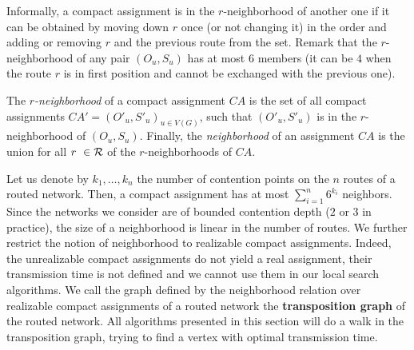 Informally, a compact assignment is in the $r$-neighborhood of another one if it can be obtained by 
moving down $r$ once (or not changing it) in the order and adding or removing $r$ and the previous route from the set. 
Remark that the $r$-neighborhood of any pair $(O_u,S_u)$ has at most $6$ members (it can be $4$ when the route $r$ is in first position and cannot be exchanged with the previous one). 

The \emph{$r$-neighborhood} of a compact assignment $CA$ is the set of all compact assignments $CA'=(O'_u,S'_u)_{u \in V(G)}$, such that  $(O'_u,S'_u)$ is in the $r$-neighborhood of $(O_u,S_u)$. Finally, the \emph{neighborhood} of an assignment $CA$ is the union for all $r \in {\cal R}$ of the $r$-neighborhoods of $CA$.

 Let us denote by $k_1,\ldots,k_n$ the number of contention points on the $n$ routes of 
 a routed network. Then, a compact assignment has at most $\sum_{i=1}^n 6^{k_i}$ neighbors. Since the networks we consider are of bounded contention depth ($2$ or $3$ in practice), the size of a neighborhood is linear in the number of routes.  We further restrict the notion of neighborhood to realizable compact assignments. Indeed, the unrealizable compact assignments do not yield a real assignment, their transmission time is not defined and we cannot use them in our local search algorithms. We call the graph defined by the neighborhood relation over realizable compact assignments of a routed network the \textbf{transposition graph} of the routed network. 
  All algorithms presented in this section will do a walk in the transposition graph, trying to find a vertex with optimal
  transmission time. 


